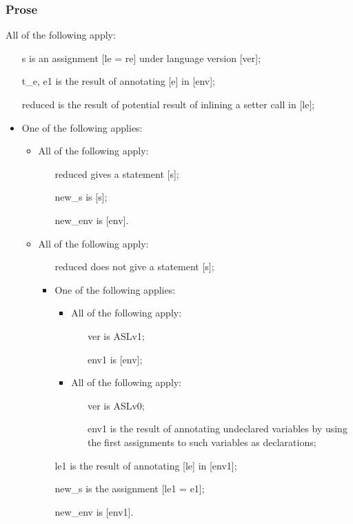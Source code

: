 \documentclass{book}
\begin{document}
    \subsubsection{Prose}
    All of the following apply:
   \begin{itemize}
   \item [s] is an assignment [le = re] under language version [ver];
   \item [t\_e, e1] is the result of annotating [e] in [env];
   \item [reduced] is the result of potential result of inlining a setter call in [le];
   \item One of the following applies:
     \begin{itemize}
     \item All of the following apply:
       \begin{itemize}
       \item [reduced] gives a statement [s];
       \item [new\_s] is [s];
       \item [new\_env] is [env].
       \end{itemize}     

     \item All of the following apply:
       \begin{itemize}
       \item [reduced] does not give a statement [s];
       \item One of the following applies:
         \begin{itemize}
         \item All of the following apply:
           \begin{itemize}
           \item [ver] is ASLv1;
           \item [env1] is [env];
           \end{itemize}
         \item All of the following apply:
           \begin{itemize}
           \item [ver] is ASLv0;
	   \item [env1] is the result of annotating undeclared variables by using
	      the first assignments to such variables as declarations;
           \end{itemize}
         \end{itemize} 

       \item [le1] is the result of annotating [le] in [env1];
       \item [new\_s] is the assignment [le1 = e1];
       \item [new\_env] is [env1].
       \end{itemize}
    \end{itemize}
  \end{itemize}
\end{document}
